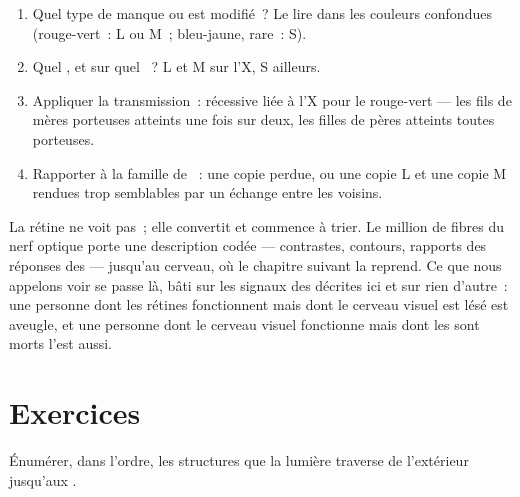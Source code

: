 \begin{method}\label{met:g11:the-eye:case}
\begin{enumerate}
  \item Quel type de  manque ou est modifié~? Le lire dans les
        couleurs confondues (rouge-vert~: L ou M~; bleu-jaune, rare~:
        S).
  \item Quel , et sur quel ~? L et M sur l'X, S
        ailleurs.
  \item Appliquer la transmission~: récessive liée à l'X pour le
        rouge-vert --- les fils de mères porteuses atteints une fois
        sur deux, les filles de pères atteints toutes porteuses.
  \item Rapporter à la famille de ~: une copie perdue, ou une
        copie L et une copie M rendues trop semblables par un échange
        entre les  voisins.
\end{enumerate}
\end{method}

\begin{remark}\label{rem:g11:the-eye:tobrain}
La rétine ne voit pas~; elle convertit et commence à trier. Le million
de fibres du nerf optique porte une description codée --- contrastes,
contours, rapports des réponses des  --- jusqu'au cerveau, où le
chapitre suivant la reprend. Ce que nous appelons voir se passe là,
bâti sur les signaux des  décrites ici et sur rien d'autre~:
une personne dont les rétines fonctionnent mais dont le cerveau visuel
est lésé est aveugle, et une personne dont le cerveau visuel fonctionne
mais dont les  sont morts l'est aussi.
\end{remark}

\section{Exercices}

\begin{exercise}[$\star$]\label{exo:g11:the-eye:1}
Énumérer, dans l'ordre, les structures que la lumière traverse de
l'extérieur jusqu'aux .
\end{exercise}

